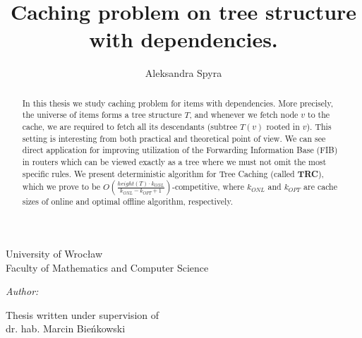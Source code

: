 \documentclass[a4paper,11pt]{article}
\title{Caching problem on tree structure with dependencies.}
\author{Aleksandra Spyra}
\makeatletter
\newcommand{\linia}{\rule{\linewidth}{0.4mm}}
\renewcommand{\maketitle}{
\begin{titlepage}
    \vspace*{1cm}
    \begin{center}
        \small
        University of Wroc\l{}aw\\
        Faculty of Mathematics and Computer Science
    \end{center}
    \vspace{3cm}
    \noindent%
    \begin{center}
        \LARGE \textsc{\@title}
    \end{center}
    \vspace{1cm}
    \begin{center}
        \textit{\small Author:}\\
        \normalsize \textsc{\@author} \par
        \vspace{5cm}
    \end{center}
    \begin{flushright}    
        {\small Thesis written under supervision of}\\
             dr. hab. Marcin Bie\'{n}kowski
    \end{flushright}
    \vspace*{\stretch{6}}
    \begin{center}
        \@date
    \end{center}
\end{titlepage}
\setcounter{page}{2}
}
\makeatother
\begin{document}
\maketitle

\begin{abstract}
In this thesis we study caching problem for items with dependencies.
More precisely, the universe of items forms a tree structure $T$, and whenever
we fetch node $v$ to the cache, we are required to fetch all its descendants
(subtree $T(v)$ rooted in $v$). This setting is interesting from both practical 
and theoretical point of view. We can see direct application for improving 
utilization of the Forwarding Information Base (FIB) in routers which can be 
viewed exactly as a tree where we must not omit the most specific rules. We 
present deterministic algorithm for Tree Caching (called \textbf{TRC}), which 
we 
prove to be $O(\frac{height(T) \cdot k_{ONL}}{k_{ONL} - k_{OPT} + 
1})$-competitive, 
where $k_{ONL}$ and $k_{OPT}$ are cache sizes of online and optimal offline 
algorithm, respectively. 
\end{abstract}

\tableofcontents




\printbibliography[maxnames=10]
\end{document}
